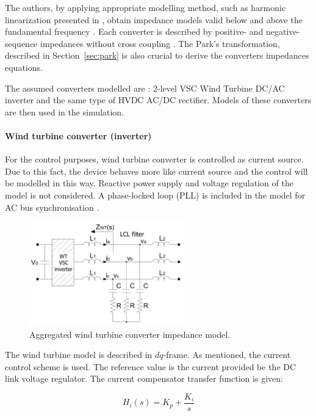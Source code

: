 \documentclass[12pt]{report} %
\begin{document}
The authors, by applying appropriate modelling method, such as harmonic linearization presented in \cite{sun2009linearization, bing2009}, obtain impedance models valid below and above the fundamental frequency \cite{liusun2014}. Each converter is described by positive- and negative-sequence impedances without cross coupling \cite{cespedes2014}. The Park's transformation, described in Section~\ref{sec:park} is also crucial to derive the converters impedances equations.

The assumed converters modelled are \cite{liusun2014}: 2-level VSC Wind Turbine DC/AC inverter and the same type of HVDC AC/DC rectifier. Models of these converters are then used in the simulation.

\paragraph{Wind turbine converter (inverter)}
For the control purposes, wind turbine converter is controlled as current source. Due to this fact, the device behaves more like current source and the control will be modelled in this way. Reactive power supply and voltage regulation of the model is not considered. A phase-locked loop (PLL) is included in the model for AC bus synchronisation \cite{liusun2014}.

\begin{figure}[htb]
	\centering
    	\includegraphics[width=0.6\textwidth]{img/theory/WT_scheme.png}
  	\caption{Aggregated wind turbine converter impedance model.}
  	\label{fig:wtscheme}
\end{figure}
\FloatBarrier

The wind turbine model is described in $dq$-frame. As mentioned, the current control scheme is used. The reference value is the current provided be the DC link voltage regulator. The current compensator transfer function is given:

\begin{equation}
	H_i (s)=K_p +\dfrac{K_i}{s}
\end{equation}
\end{document}
